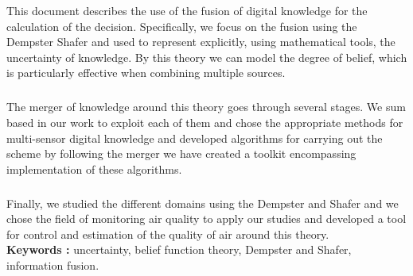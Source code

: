 \documentclass[a4paper, 12pt]{report}
\begin{document}
This document describes the use of the fusion of digital knowledge for the calculation of the decision. Specifically, we focus on the fusion using the Dempster Shafer and used to represent explicitly, using mathematical tools, the uncertainty of knowledge. By this theory we can model the degree of belief, which is particularly effective when combining multiple sources.
\subparagraph{}
The merger of knowledge around this theory goes through several stages. We sum based in our work to exploit each of them and chose the appropriate methods for multi-sensor digital knowledge and developed algorithms for carrying out the scheme by following the merger we have created a toolkit encompassing implementation of these algorithms.
\subparagraph{}
Finally, we studied the different domains using the Dempster and Shafer and we chose the field of monitoring air quality to apply our studies and developed a tool for control and estimation of the quality of air around this theory.
\\
\textbf{Keywords :} uncertainty, belief function theory, Dempster and Shafer, information fusion.
\end{document}
